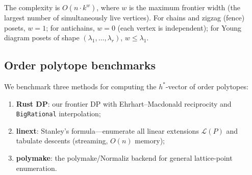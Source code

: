 \documentclass[11pt,reqno]{amsart}
\theoremstyle{definition}
\begin{document}
The complexity is $O(n \cdot k^{w})$, where $w$ is the maximum
frontier width (the largest number of simultaneously live vertices).
For chains and zigzag (fence) posets, $w = 1$; for antichains,
$w = 0$ (each vertex is independent); for Young diagram posets of
shape $(\lambda_1, \dotsc, \lambda_r)$, $w \leq \lambda_1$.

\subsection{Order polytope benchmarks}\label{subs:orderBenchmarks}

We benchmark three methods for computing the $h^*$-vector of order polytopes:
\begin{enumerate}
\item \textbf{Rust DP}: our frontier DP with Ehrhart--Macdonald reciprocity
  and \texttt{BigRational} interpolation;
\item \textbf{linext}: Stanley's formula---enumerate all linear extensions
  $\mathcal{L}(P)$ and tabulate descents (streaming, $O(n)$ memory);
\item \textbf{polymake}: the polymake/Normaliz backend for general
  lattice-point enumeration.
\end{enumerate}
\end{document}
